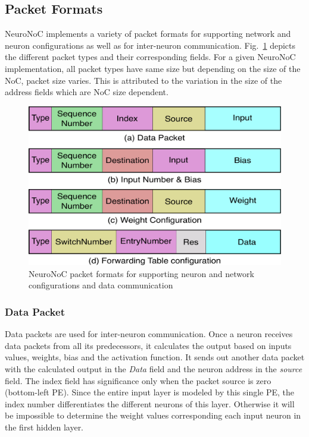 \subsection{Packet Formats}
\label{subsecpktformat}
NeuroNoC implements a variety of packet formats for supporting network and neuron configurations as well as for inter-neuron communication.  
Fig.~\ref{figure:pktformat} depicts the different packet types and their corresponding fields.
For a given NeuroNoC implementation, all packet types have same size but depending on the size of the NoC, packet size varies.
This is attributed to the variation in the size of the address fields which are NoC size dependent. 
\begin{figure}[t!]
    \begin{center}
    \includegraphics[width=0.8\columnwidth]{Figures/pktformat.pdf}
    \caption{NeuroNoC packet formats for supporting neuron and network configurations and data communication} 
    \label{figure:pktformat}
    \end{center}
\end{figure}

\subsubsection*{\bf Data Packet}
Data packets are used for inter-neuron communication.
Once a neuron receives data packets from all its predecessors, it calculates the output based on inputs values, weights, bias and the activation function.
It sends out another data packet with the calculated output in the \emph{Data} field and the neuron address in the \emph{source} field.
The index field has significance only when the packet source is zero (bottom-left PE).
Since the entire input layer is modeled by this single PE, the index number differentiates the different neurons of this layer.
Otherwise it will be impossible to determine the weight values corresponding each input neuron in the first hidden layer.
